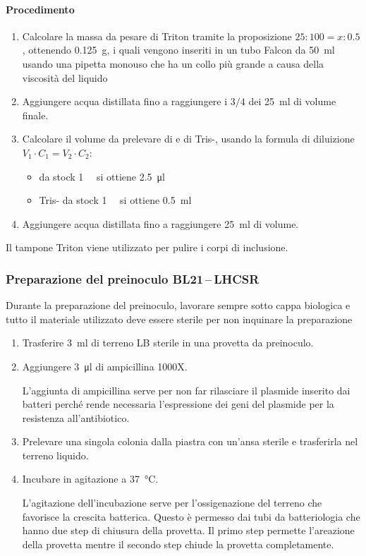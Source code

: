 \paragraph{Procedimento}
\begin{enumerate}
	\item Calcolare la massa da pesare di Triton tramite la proposizione \(25:100=x:0.5\), ottenendo \qty{0.125}{\g}, i quali vengono inseriti in un tubo Falcon da \qty{50}{\ml} usando una pipetta monouso che ha un collo più grande a causa della viscosità del liquido 
	\item Aggiungere acqua distillata fino a raggiungere i \(3/4\) dei \qty{25}{\ml} di volume finale.
	\item Calcolare il volume da prelevare di  e di Tris-, usando la formula di diluizione \mbox{\(V_1\cdot C_1 = V_2\cdot C_2\)}:
	\begin{itemize}
		\item {} da stock \qty{1}{\milli\Molar} si ottiene \qty{2.5}{\micro\litre}
		\item Tris- da stock \qty{1}{\milli\Molar} si ottiene \qty{0.5}{\ml}
	\end{itemize}
	\item Aggiungere acqua distillata fino a raggiungere \qty{25}{\ml} di volume.
\end{enumerate}
Il tampone Triton viene utilizzato per pulire i corpi di inclusione.


\subsubsection{Preparazione del preinoculo BL21\texorpdfstring{\,--\,}{--}LHCSR}
\begin{Attenzione}
	Durante la preparazione del preinoculo, lavorare sempre sotto cappa biologica e tutto il materiale utilizzato deve essere sterile per non inquinare la preparazione
\end{Attenzione}
\begin{enumerate}
	\item Trasferire \qty{3}{\ml} di terreno LB sterile in una provetta da preinoculo.
	\item Aggiungere \qty{3}{\micro\litre} di ampicillina 1000X. 
	\begin{Note}
		L'aggiunta di ampicillina serve per non far rilasciare il plasmide inserito dai batteri perché rende necessaria l'espressione dei geni del plasmide per la resistenza all'antibiotico.
	\end{Note}
	\item Prelevare una singola colonia dalla piastra con un’ansa sterile e trasferirla nel terreno liquido.
	\item Incubare in agitazione a \qty{37}{\celsius}.
	\begin{Note}
		L'agitazione dell'incubazione serve per l'ossigenazione del terreno che favorisce la crescita batterica. Questo è permesso dai tubi da batteriologia che hanno due step di chiusura della provetta. Il primo step permette l'areazione della provetta mentre il secondo step chiude la provetta completamente.
	\end{Note}
\end{enumerate}
	
